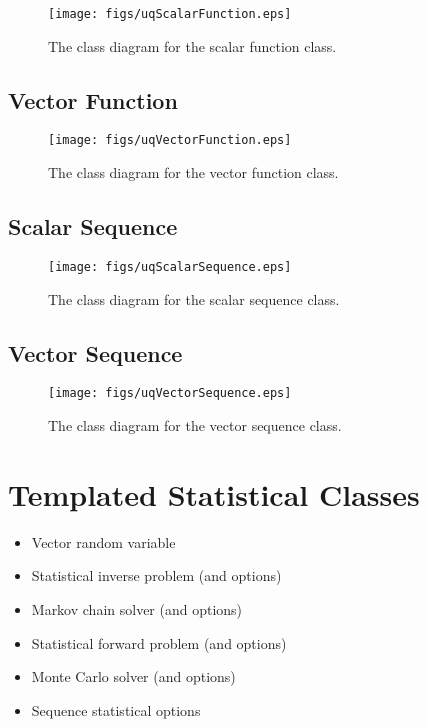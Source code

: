 \begin{figure}[h!]
\centerline{
\texttt{[image: figs/uqScalarFunction.eps]}
}
\caption{
The class diagram for the scalar function class.
}
\label{fig-scalar-function-class}
\end{figure}

\clearpage
\subsection{Vector Function}

\begin{figure}[h!]
\centerline{
\texttt{[image: figs/uqVectorFunction.eps]}
}
\caption{
The class diagram for the vector function class.
}
\label{fig-vector-function-class}
\end{figure}

\clearpage
\subsection{Scalar Sequence}

\begin{figure}[h!]
\centerline{
\texttt{[image: figs/uqScalarSequence.eps]}
}
\caption{
The class diagram for the scalar sequence class.
}
\label{fig-scalar-sequence-class}
\end{figure}

\clearpage
\subsection{Vector Sequence}

\begin{figure}[h!]
\centerline{
\texttt{[image: figs/uqVectorSequence.eps]}
}
\caption{
The class diagram for the vector sequence class.
}
\label{fig-vector-sequence-class}
\end{figure}

\clearpage
\section{Templated Statistical Classes}

\begin{itemize}
\item Vector random variable
\item Statistical inverse problem (and options)
\item Markov chain solver (and options)
\item Statistical forward problem (and options)
\item Monte Carlo solver (and options)
\item Sequence statistical options
\end{itemize}

